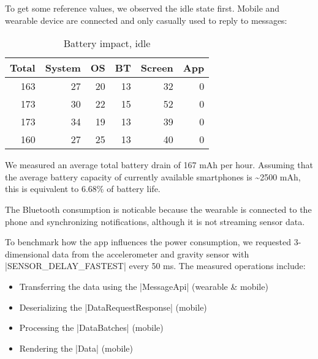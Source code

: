 To get some reference values, we observed the idle state first.
Mobile and wearable device are connected and only casually used to reply to messages:

\begin{table}[H]
    \centering
    \begin{tabular}{rrrrrr}
        Total    & System   & OS       & BT       & Screen   & App  \\ \hline

        163      & 27       & 20       & 13       & 32       & 0    \\
        173      & 30       & 22       & 15       & 52       & 0    \\
        173      & 34       & 19       & 13       & 39       & 0    \\
        160      & 27       & 25       & 13       & 40       & 0    \\
    \end{tabular}
    \caption{Battery impact, idle}
    \label{table:benchmark:battery:idle}
\end{table}

We measured an average total battery drain of 167 mAh per hour.
Assuming that the average battery capacity of currently available smartphones is \textasciitilde2500 mAh, this is equivalent to 6.68\% of battery life.

The Bluetooth consumption is noticable because the wearable is connected to the phone and synchronizing notifications, although it is not streaming sensor data.

To benchmark how the app influences the power consumption, we requested 3-dimensional data from the accelerometer and gravity sensor with |SENSOR_DELAY_FASTEST| every 50 ms. The measured operations include:

\begin{itemize}[noitemsep]
    \item Transferring the data using the |MessageApi| (wearable \& mobile)
    \item Deserializing the |DataRequestResponse| (mobile)
    \item Processing the |DataBatches| (mobile)
    \item Rendering the |Data|\cite{sensordatalogger:data} (mobile)
\end{itemize}

